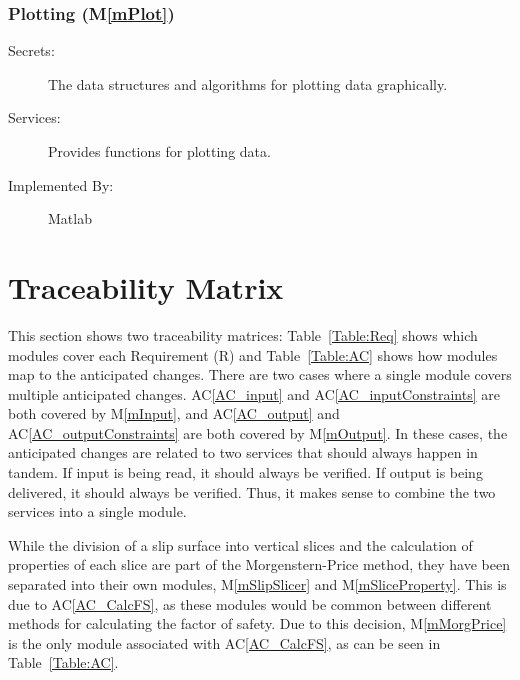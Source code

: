 \documentclass[12pt, titlepage]{article}
\newcommand{\acref}[1]{AC\ref{#1}}
\newcommand{\mref}[1]{M\ref{#1}}
\begin{document}
\subsubsection{Plotting (\mref{mPlot})}

\begin{description}
\item[Secrets:] The data structures and algorithms for plotting data
  graphically.
\item[Services:] Provides functions for plotting data.
\item[Implemented By:] Matlab
\end{description}

\section{Traceability Matrix} \label{SecTM}

\hspace{3ex}This section shows two traceability matrices: Table~\ref{Table:Req} 
shows which modules cover each Requirement (R) and Table~\ref{Table:AC} shows 
how modules map to the anticipated changes. There are two cases where a single 
module covers multiple anticipated changes. \acref{AC_input} and 
\acref{AC_inputConstraints} are both covered by \mref{mInput}, and 
\acref{AC_output} and \acref{AC_outputConstraints} are both covered by 
\mref{mOutput}. In these cases, the anticipated changes are related to two 
services that should always happen in tandem. If input is being read, it should 
always be verified. If output is being delivered, it should always be verified. 
Thus, it makes sense to combine the two services into a single module.

While the division of a slip surface into vertical slices and the calculation 
of properties of each slice are part of the Morgenstern-Price method, they have 
been separated into their own modules, \mref{mSlipSlicer} and 
\mref{mSliceProperty}. This is due to \acref{AC_CalcFS}, as these modules would 
be common between different methods for calculating the factor of safety. Due 
to this decision, \mref{mMorgPrice} is the only module associated with 
\acref{AC_CalcFS}, as can be seen in Table~\ref{Table:AC}.
\end{document}

